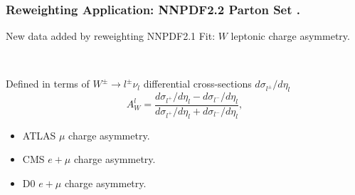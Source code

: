 \documentclass[10pt]{beamer}
\newcommand{\be}{\begin{equation*}}
\newcommand{\ee}{\end{equation*}}
\begin{document}
\begin{frame}
\frametitle{Reweighting Application: NNPDF2.2 Parton Set .}
New data added by reweighting NNPDF2.1 Fit: $W$ leptonic charge asymmetry.
\begin{centering}
\\
\end{centering}\vskip5pt
Defined in terms of $W^{\pm}\to l^\pm\nu_l $ differential cross-sections $d\sigma_{l^\pm}/d\eta_l$
\be 
  A^l_W=\frac{d\sigma_{l^{+}}/d\eta_{l}-d\sigma_{l^{-}}/d\eta_{l}}
  {d\sigma_{l^{+}}/d\eta_{l}+d\sigma_{l^{-}}/d\eta_{l}}, 
\ee

\begin{itemize}
		\item<1-> ATLAS $\mu$ charge asymmetry. \hspace*{\fill {  \color{blue} [arXiv:1103.2929]}}
		\item<1-> CMS $e+\mu$ charge asymmetry. \hspace*{\fill { \color{blue}  [arXiv:1103.3470] }}
		\item<1-> D0 $e+\mu$ charge asymmetry. \hspace*{\fill { \color{blue} [arXiv:0709.4254]}}
\end{itemize}

\begin{figure}[h!]
  \centering
\end{figure}

\end{frame}
\end{document}
